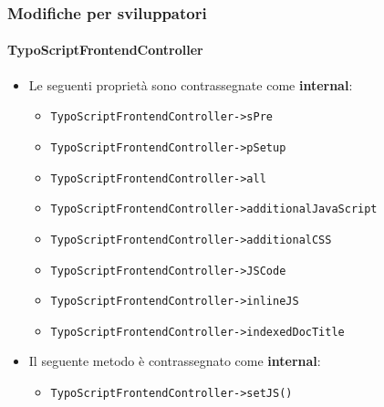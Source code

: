 \begin{frame}[fragile]
	\frametitle{Modifiche per sviluppatori}
	\framesubtitle{TypoScriptFrontendController}

	\begin{itemize}
		\item Le seguenti proprietà sono contrassegnate come \textbf{internal}:
			\begin{itemize}
				\item \texttt{TypoScriptFrontendController->sPre}
				\item \texttt{TypoScriptFrontendController->pSetup}
				\item \texttt{TypoScriptFrontendController->all}
				\item \texttt{TypoScriptFrontendController->additionalJavaScript}
				\item \texttt{TypoScriptFrontendController->additionalCSS}
				\item \texttt{TypoScriptFrontendController->JSCode}
				\item \texttt{TypoScriptFrontendController->inlineJS}
				\item \texttt{TypoScriptFrontendController->indexedDocTitle}
			\end{itemize}

		\item Il seguente metodo è contrassegnato come \textbf{internal}:

			\begin{itemize}
				\item \texttt{TypoScriptFrontendController->setJS()}
			\end{itemize}

	\end{itemize}

\end{frame}


